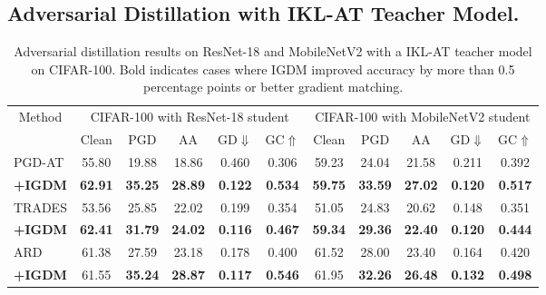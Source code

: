 \documentclass{article} %
\begin{document}
\subsection{Adversarial Distillation with IKL-AT Teacher Model.}
\label{sec:IKL-AT}
\begin{table}[h]
 \centering
 \caption{Adversarial distillation results on ResNet-18 and MobileNetV2 with a IKL-AT teacher model on CIFAR-100. Bold indicates cases where IGDM improved accuracy by more than 0.5 percentage points or better gradient matching.}
 \setlength{\tabcolsep}{6pt}
 \begin{tabular}{lcccccccccc}
 \toprule
    \multicolumn{1}{c}{\multirow{2.5}{*}{Method}}  & \multicolumn{5}{c}{CIFAR-100 with ResNet-18 student}& \multicolumn{5}{c}{CIFAR-100 with MobileNetV2 student} \\
   \cmidrule(r){2-6}
   \cmidrule(r){7-11}
   & Clean & PGD & AA & GD$\Downarrow$ & GC$\Uparrow$ & Clean & PGD & AA & GD$\Downarrow$ & GC$\Uparrow$ \\
\midrule

 PGD-AT  & 55.80 & 19.88 & 18.86 & 0.460 & 0.306 & 59.23 & 24.04 & 21.58 & 0.211 
& 0.392
\\
 \textbf{+IGDM} & \textbf{62.91} & \textbf{35.25} & \textbf{28.89} & \textbf{0.122}& \textbf{0.534} & \textbf{59.75} & \textbf{33.59} & \textbf{27.02} & \textbf{0.120} 
& 
\textbf{0.517}
\\
 \midrule
 TRADES & 53.56 & 25.85 & 22.02 & 0.199& 0.354 & 51.05 & 24.83 & 20.62 & 0.148 
& 0.351
\\
 \textbf{+IGDM}  & \textbf{62.41} & \textbf{31.79} & \textbf{24.02} & \textbf{0.116}& \textbf{0.467} & \textbf{59.34} & \textbf{29.36} & \textbf{22.40} & \textbf{0.120} 
& 
\textbf{0.444}
\\
 \midrule
 ARD & 61.38 & 27.59 & 23.18 & 0.178& 0.400 & 61.52 & 28.00 & 23.40 & 0.164 
& 0.420 
\\
 \textbf{+IGDM} & 61.55 & \textbf{35.24} & \textbf{28.87} & \textbf{0.117}& \textbf{0.546} & 61.95 & \textbf{32.26}& \textbf{26.48} & \textbf{0.132} 
& 
\textbf{0.498} 
\\
 \midrule


\end{tabular}
\end{table}
\end{document}
